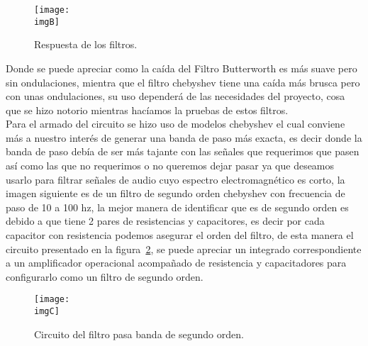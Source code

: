 \documentclass[a4paper,12pt]{article}
\newcommand{\imgB}{img/graficas.png}
\newcommand{\imgC}{img/FiltroPasaBanda2.jpg}
\begin{document}
    \begin{figure}[H] 
        \centering 
        \texttt{[image: \\imgB]} 
        \caption{Respuesta de los filtros.} 
        \label{fig:B} 
    \end{figure} 

    Donde se puede apreciar como la caída del Filtro Butterworth es más suave pero sin ondulaciones, mientra que el filtro chebyshev tiene una caída más brusca pero con unas ondulaciones, su uso dependerá de las necesidades del proyecto, cosa que se hizo notorio mientras hacíamos la pruebas de estos filtros.\\
    Para el armado del circuito se hizo uso de modelos chebyshev el cual conviene más a nuestro interés de generar una banda de paso más exacta, es decir donde la banda de paso debía de ser más tajante con las señales que requerimos que pasen así como las que no requerimos o no queremos dejar pasar ya que deseamos usarlo para filtrar señales de audio cuyo espectro electromagnético es corto, la imagen siguiente es de un filtro de segundo orden chebyshev con frecuencia de paso de 10 a 100 hz, la mejor manera de identificar que es de segundo orden es debido a que tiene 2 pares de resistencias y capacitores, es decir por cada capacitor con resistencia podemos asegurar el orden del filtro, de esta manera el circuito presentado en la figura~\ref{fig:C}, se puede apreciar un integrado correspondiente a un amplificador operacional acompañado de resistencia y capacitadores para configurarlo como un filtro de segundo orden.

    \begin{figure}[H] 
        \centering 
        \texttt{[image: \\imgC]} 
        \caption{Circuito del filtro pasa banda de segundo orden.} 
        \label{fig:C} 
    \end{figure} 
\end{document}
